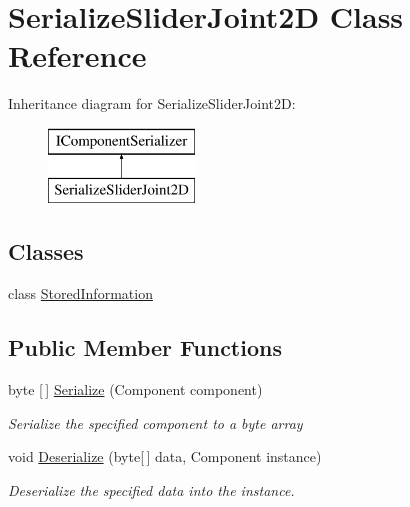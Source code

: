 \hypertarget{class_serialize_slider_joint2_d}{}\section{Serialize\+Slider\+Joint2D Class Reference}
\label{class_serialize_slider_joint2_d}
Inheritance diagram for Serialize\+Slider\+Joint2D\+:\begin{figure}[H]
\begin{center}
\leavevmode
\includegraphics[height=2.000000cm]{class_serialize_slider_joint2_d}
\end{center}
\end{figure}
\subsection*{Classes}
\begin{DoxyCompactItemize}
\item 
class \hyperlink{class_serialize_slider_joint2_d_1_1_stored_information}{Stored\+Information}
\end{DoxyCompactItemize}
\subsection*{Public Member Functions}
\begin{DoxyCompactItemize}
\item 
byte \mbox{[}$\,$\mbox{]} \hyperlink{class_serialize_slider_joint2_d_ad690d87ffc29815b59900bde784a1ed3}{Serialize} (Component component)
\begin{DoxyCompactList}\small\item\em Serialize the specified component to a byte array \end{DoxyCompactList}\item 
void \hyperlink{class_serialize_slider_joint2_d_a50d76e3724e23d0acc752f75715be6e8}{Deserialize} (byte\mbox{[}$\,$\mbox{]} data, Component instance)
\begin{DoxyCompactList}\small\item\em Deserialize the specified data into the instance. \end{DoxyCompactList}\end{DoxyCompactItemize}


